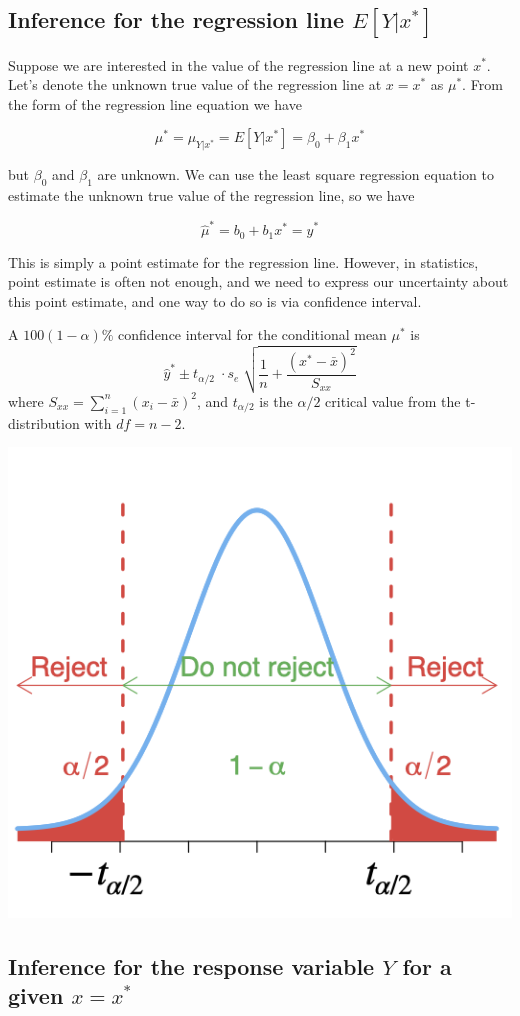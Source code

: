 \documentclass[
]{article}
\begin{document}
\hypertarget{inference-for-the-regression-line-eleftyxright}{%
\subsection{\texorpdfstring{Inference for the regression line
\(E\left[Y|x^*\right]\)}{Inference for the regression line E\textbackslash left{[}Y\textbar x\^{}*\textbackslash right{]}}}\label{inference-for-the-regression-line-eleftyxright}}

Suppose we are interested in the value of the regression line at a new
point \(x^*\). Let's denote the unknown true value of the regression
line at \(x=x^*\) as \(\mu^*\). From the form of the regression line
equation we have

\[\mu^*=\mu_{Y|x^*}=E\left[Y|x^*\right]=\beta_0+\beta_1 x^*\]

but \(\beta_0\) and \(\beta_1\) are unknown. We can use the least square
regression equation to estimate the unknown true value of the regression
line, so we have

\[\hat{\mu}^*=b_0+b_1 x^*=\hat{y}^*\]

This is simply a point estimate for the regression line. However, in
statistics, point estimate is often not enough, and we need to express
our uncertainty about this point estimate, and one way to do so is via
confidence interval.

A \(100(1-\alpha)\%\) confidence interval for the conditional mean
\(\mu^*\) is
\[\hat{y}^*\pm t_{\alpha/2}\;\cdot s_e\;\sqrt{\frac{1}{n}+\frac{(x^*-\bar{x})^2}{S_{xx}}}\]
where \(S_{xx}=\sum_{i=1}^{n} (x_i-\bar{x})^2\), and \(t_{\alpha/2}\) is
the \(\alpha/2\) critical value from the t-distribution with \(df=n-2\).

\begin{center}\includegraphics[width=0.35\linewidth,height=0.35\textheight]{figures/Ttest2} \end{center}

\hypertarget{inference-for-the-response-variable-y-for-a-given-xx}{%
\subsection{\texorpdfstring{Inference for the response variable \(Y\)
for a given
\(x=x^*\)}{Inference for the response variable Y for a given x=x\^{}*}}\label{inference-for-the-response-variable-y-for-a-given-xx}}
\end{document}

